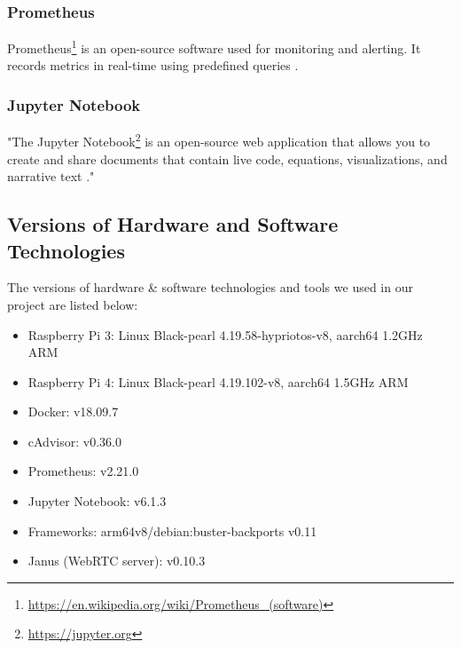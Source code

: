 \subsubsection{Prometheus}
Prometheus\footnote{\url{https://en.wikipedia.org/wiki/Prometheus_(software)}} is an open-source software used for monitoring and alerting. It records metrics in real-time using predefined queries \cite{prometheus}. \par

\subsubsection{Jupyter Notebook}
"The Jupyter Notebook\footnote{\url{https://jupyter.org}} is an open-source web application that allows you to create and share documents that contain live code, equations, visualizations, and narrative text \cite{jn}."

\subsection{Versions of Hardware and Software Technologies}
The versions of hardware \& software technologies and tools we used in our project are listed below:
\begin{itemize}
   \item Raspberry Pi 3: Linux Black-pearl 4.19.58-hypriotos-v8, aarch64 1.2GHz ARM
   \item Raspberry Pi 4: Linux Black-pearl 4.19.102-v8, aarch64 1.5GHz ARM
   \item Docker: v18.09.7
   \item cAdvisor: v0.36.0
   \item Prometheus: v2.21.0
   \item Jupyter Notebook: v6.1.3
   \item Frameworks: arm64v8/debian:buster-backports v0.11
   \item Janus (WebRTC server): v0.10.3
\end{itemize}